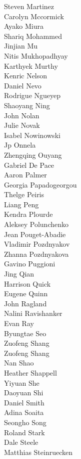 Steven  Martinez\\
Carolyn Mccormick\\
Ayako Miura\\
Shariq Mohammed\\
Jinjian Mu\\
Nitis Mukhopadhyay\\
Karthyek Murthy\\
Kenric Nelson\\
Daniel Nevo\\
Rodrigue Ngueyep\\
Shaoyang Ning\\
John Nolan\\
Julie Novak\\
Isabel Nowinowski\\
Jp Onnela\\
Zhengqing Ouyang\\
Gabriel De Pace\\
Aaron Palmer\\
Georgia Papadogeorgou\\
Thelge Peiris\\
Liang Peng\\
Kendra Plourde\\
Aleksey Polunchenko\\
Jean Pouget-Abadie\\
Vladimir Pozdnyakov\\
Zhanna Pozdnyakova\\
Gavino Puggioni\\
Jing Qian\\
Harrison  Quick\\
Eugene Quinn\\
John Ragland\\
Nalini Ravishanker\\
Evan Ray\\
Byungtae Seo\\
Zuofeng Shang\\
Zuofeng Shang\\
Nan Shao\\
Heather Shappell\\
Yiyuan She\\
Daoyuan Shi\\
Daniel Smith\\
Adina Soaita\\
Seongho Song\\
Roland Stark\\
Dale Steele\\
Matthias Steinruecken\\
